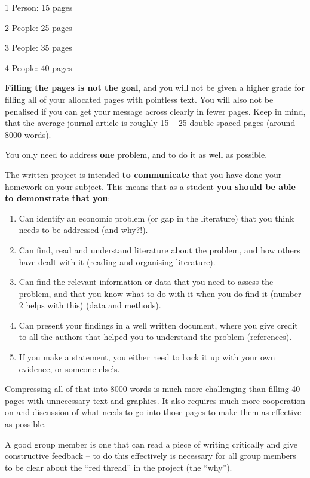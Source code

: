 \documentclass[
]{book}
\begin{document}
1 Person: 15 pages

2 People: 25 pages

3 People: 35 pages

4 People: 40 pages

\textbf{Filling the pages is not the goal}, and you will not be given a
higher grade for filling all of your allocated pages with pointless
text. You will also not be penalised if you can get your message across
clearly in fewer pages. Keep in mind, that the average journal article
is roughly 15 -- 25 double spaced pages (around 8000 words).

You only need to address \textbf{one} problem, and to do it as well as
possible.

The written project is intended \textbf{to communicate} that you have done
your homework on your subject. This means that as a student \textbf{you should
be able to demonstrate that you}:

\begin{enumerate}
\def\labelenumi{\arabic{enumi}.}
\item
  Can identify an economic problem (or gap in the literature) that you
  think needs to be addressed (and why?!).
\item
  Can find, read and understand literature about the problem, and how
  others have dealt with it (reading and organising literature).
\item
  Can find the relevant information or data that you need to assess
  the problem, and that you know what to do with it when you do find
  it (number 2 helps with this) (data and methods).
\item
  Can present your findings in a well written document, where you give
  credit to all the authors that helped you to understand the
  problem (references).
\item
  If you make a statement, you either need to back it up with your own
  evidence, or someone else's.
\end{enumerate}

Compressing all of that into 8000 words is much more challenging than
filling 40 pages with unnecessary text and graphics. It also requires
much more cooperation on and discussion of what needs to go into those
pages to make them as effective as possible.

A good group member is one that can read a piece of writing critically
and give constructive feedback -- to do this effectively is necessary
for all group members to be clear about the ``red thread'' in the project
(the ``why'').
\end{document}
